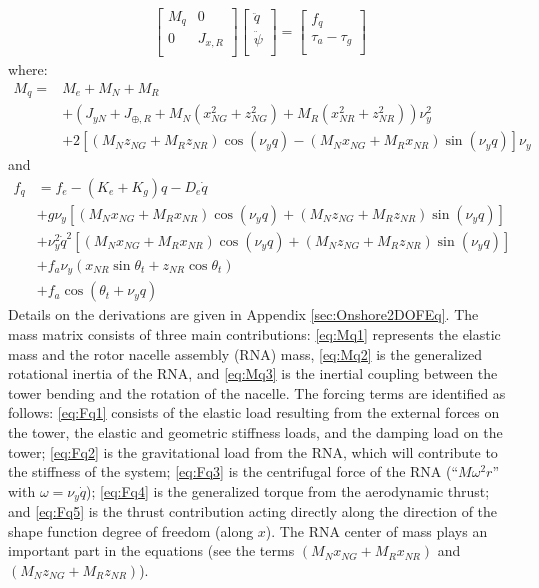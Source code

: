 \documentclass[wes, manuscript]{copernicus}
\begin{document}
\begin{align}
    \begin{bmatrix}
    M_q & 0 \\ 
    0 & J_{x,R} \\ 
    \end{bmatrix}
    \begin{bmatrix}
    \ddot{q}\\
    \ddot{\psi}\\
    \end{bmatrix}
    =
    \begin{bmatrix}
    f_q \\
    \tau_a-\tau_g\\
    \end{bmatrix}
    \label{eq:EOM2DOF}
\end{align}
where:
\begin{align}
M_q = & M_{e} +  M_N + M_R \label{eq:Mq1}\\
     &+ (J_{y N} + J_{\oplus,R} + M_N(x_{NG}^{2} + z_{NG}^{2}) + M_R(x_{NR}^{2} + z_{NR}^{2}) ) \nu_y^{2}  \label{eq:Mq2}\\
     &+2  \left[   (M_N z_{NG} + M_R z_{NR}) \cos{\left(\nu_y q \right)} -(M_N x_{NG} + M_{R} x_{NR})\sin{\left(\nu_y q \right)} \right] \nu_y\label{eq:Mq3}
\end{align}
and
\begin{align}
 f_q &= f_{e} - (K_{e}+K_g) q  - D_{e} \dot{q} \label{eq:Fq1} \\
 &+ g \nu_y \left [ (M_N x_{NG}+M_R x_{NR}) \cos{\left(\nu_y q \right)}
 +                  (M_N z_{NG}+M_R z_{NR}) \sin{\left(\nu_y q \right)} \right]  \label{eq:Fq2}\\
 &+ \nu_y^2 \dot{q}^2\left[
  ( M_N x_{NG} + M_R x_{NR}) \cos{\left(\nu_y q \right)} 
 +( M_N z_{NG} + M_R z_{NR}) \sin{\left(\nu_y q \right)}
 \right]  \label{eq:Fq3} \\
 &+f_a \nu_y ( x_{NR} \sin\theta_t + z_{NR} \cos\theta_t)  \label{eq:Fq4} \\
 &+ f_a \cos{\left(\theta_t + \nu_y q \right)}\label{eq:Fq5} 
\end{align}
Details on the derivations are given in Appendix \ref{sec:Onshore2DOFEq}.
The mass matrix consists of three main contributions:
\autoref{eq:Mq1} represents the elastic mass and the rotor nacelle assembly (RNA) mass,
\autoref{eq:Mq2} is the generalized rotational inertia of the RNA, and
\autoref{eq:Mq3} is the inertial coupling between the tower bending and the rotation of the nacelle.
The forcing terms are identified as follows:
\autoref{eq:Fq1} consists of the elastic load resulting from the external forces on the tower, the elastic and geometric stiffness loads, and the damping load on the tower; 
\autoref{eq:Fq2} is the gravitational load from the RNA, which will contribute to the stiffness of the system; 
\autoref{eq:Fq3} is the centrifugal force of the RNA (``$M \omega^2 r$'' with $\omega=\nu_y \dot{q}$);
\autoref{eq:Fq4} is the generalized torque from the aerodynamic thrust; and  
\autoref{eq:Fq5} is the thrust contribution acting directly along the direction of the shape function degree of freedom (along $x$).
The RNA center of mass plays an important part in the equations (see the terms $(M_N x_{NG}+M_R x_{NR})$ and $(M_N z_{NG}+M_R z_{NR})$). 
\end{document}
